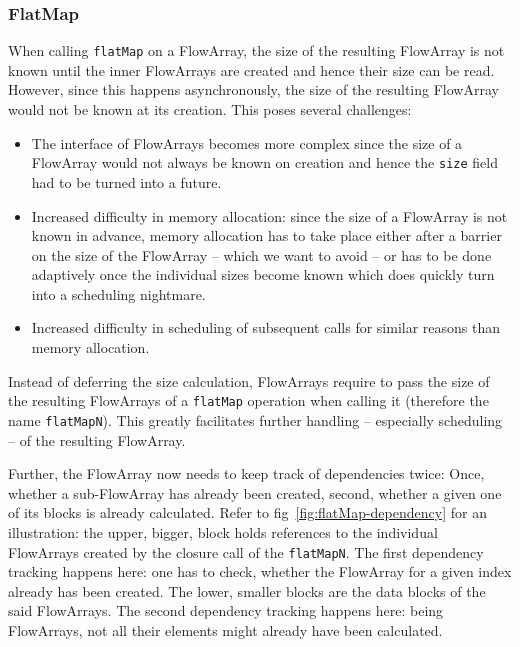 \documentclass[runningheads,a4paper,fleqn]{llncs}
\begin{document}
\subsubsection{FlatMap}
\label{sssec:flatMapN}

When calling \texttt{flatMap} on a FlowArray, the size of the
resulting FlowArray is not known until the inner FlowArrays are
created and hence their size can be read. However, since this happens 
asynchronously, the size of the resulting FlowArray would not be known
at its creation. This poses several challenges:

\begin{itemize}
\item The interface of FlowArrays becomes more complex since the size
  of a FlowArray would not always be known on creation and hence the
  \texttt{size} field had to be turned into a future.
\item Increased difficulty in memory allocation: since the size of a
  FlowArray is not known in advance, memory allocation has to take
  place either after a barrier on the size of the FlowArray -- which
  we want to avoid -- or has to be done adaptively once the individual
  sizes become known which does quickly turn into a scheduling
  nightmare. 
\item Increased difficulty in scheduling of subsequent calls for
  similar reasons than memory allocation.
\end{itemize}

Instead of deferring the size calculation, FlowArrays require to pass
the size of the resulting FlowArrays of a \texttt{flatMap} operation
when calling it (therefore the name \texttt{flatMapN}). This greatly 
facilitates further handling -- especially scheduling -- of the
resulting FlowArray.

Further, the FlowArray now needs to keep track of dependencies twice:
Once, whether a sub-FlowArray has already been created, second,
whether a given one of its blocks is already calculated. Refer to
fig~\ref{fig:flatMap-dependency} for an illustration: the upper,
bigger, block holds references to the individual FlowArrays created by
the closure call of the \texttt{flatMapN}. The first dependency
tracking happens here: one has to check, whether the FlowArray for a
given index already has been created. The lower, smaller blocks are
the data blocks of the said FlowArrays. The second dependency tracking
happens here: being FlowArrays, not all their elements might already
have been calculated.
\end{document}
